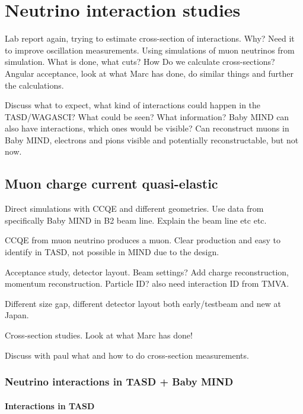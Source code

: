 \chapter{Neutrino interaction studies}
\label{c:neutrino}

Lab report again, trying to estimate cross-section of interactions. Why? Need it to improve oscillation measurements. Using simulations of muon neutrinos from simulation. What is done, what cuts? How Do we calculate cross-sections? Angular acceptance, look at what Marc has done, do similar things and further the calculations.

Discuss what to expect, what kind of interactions could happen in the TASD/WAGASCI? What could be seen? What information? Baby MIND can also have interactions, which ones would be visible? Can reconstruct muons in Baby MIND, electrons and pions visible and potentially reconstructable, but not now.

\section{Muon charge current quasi-elastic}

Direct simulations with CCQE and different geometries. Use data from specifically Baby MIND in B2 beam line. Explain the beam line etc etc.

CCQE from muon neutrino produces a muon. Clear production and easy to identify in TASD, not possible in MIND due to the design. 



Acceptance study, detector layout. Beam settings? Add charge reconstruction, momentum reconstruction. Particle ID? also need interaction ID from TMVA.

Different size gap, different detector layout both early/testbeam and new at Japan.


Cross-section studies. Look at what Marc has done! 

Discuss with paul what and how to do cross-section measurements.

\subsection{Neutrino interactions in TASD + Baby MIND}




\subsubsection{Interactions in TASD}

